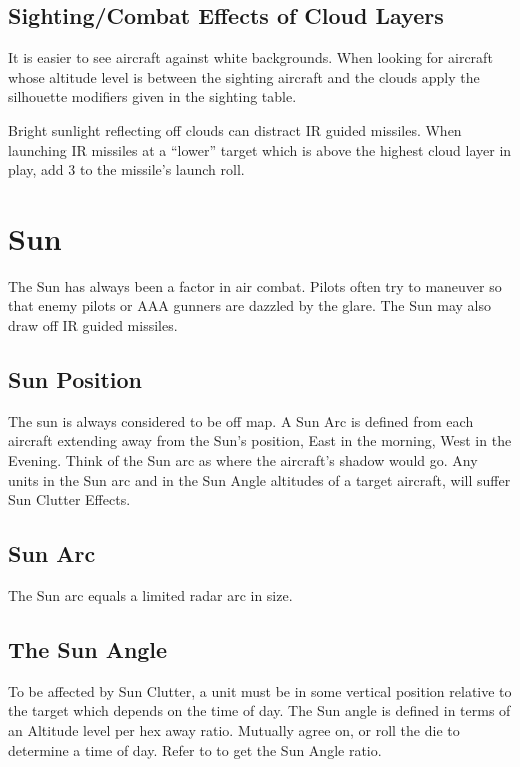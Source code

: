 \begin{advancedrules}
    \subsection{Sighting/Combat Effects of Cloud Layers} It is easier to see aircraft against white backgrounds. When looking for aircraft whose altitude level is between the sighting aircraft and the clouds apply the silhouette modifiers given in the sighting table.

    Bright sunlight reflecting off clouds can distract IR guided missiles. When launching IR missiles at a “lower” target which is above the highest cloud layer in play, add 3 to the missile's launch roll.

    \section{Sun}
    \label{rule:sun}

    The Sun has always been a factor in air combat. Pilots often try to maneuver so that enemy pilots or AAA gunners are dazzled by the glare. The Sun may also draw off IR guided missiles.

    \subsection{Sun Position} The sun is always considered to be off map. A Sun Arc is defined from each aircraft extending away from the Sun's position, East in the morning, West in the Evening. Think of the Sun arc as where the aircraft's shadow would go. Any units in the Sun arc and in the Sun Angle altitudes of a target aircraft, will suffer Sun Clutter Effects.

    \subsection{Sun Arc} The Sun arc equals a limited radar arc in size.


    \subsection{The Sun Angle} To be affected by Sun Clutter, a unit must be in some vertical position relative to the target which depends on the time of day. The Sun angle is defined in terms of an Altitude level per hex away ratio. Mutually agree on, or roll the die to determine a time of day. Refer to  to get the Sun Angle ratio.


\end{advancedrules}
